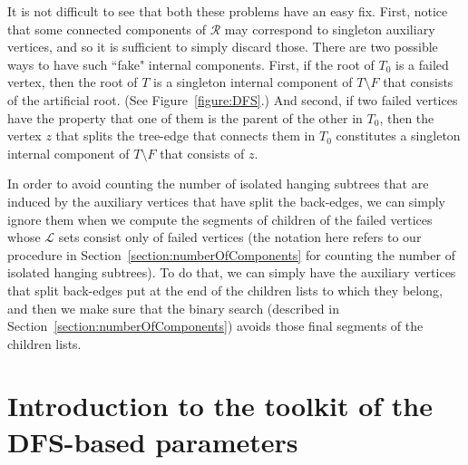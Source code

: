 \documentclass[11pt,a4paper]{article}
\begin{document}
It is not difficult to see that both these problems have an easy fix. First, notice that some connected components of $\mathcal{R}$ may correspond to singleton auxiliary vertices, and so it is sufficient to simply discard those. There are two possible ways to have such ``fake" internal components. First, if the root of $T_0$ is a failed vertex, then the root of $T$ is a singleton internal component of $T\setminus F$ that consists of the artificial root. (See Figure~\ref{figure:DFS}.) And second, if two failed vertices have the property that one of them is the parent of the other in $T_0$, then the vertex $z$ that splits the tree-edge that connects them in $T_0$ constitutes a singleton internal component of $T\setminus F$ that consists of $z$.

In order to avoid counting the number of isolated hanging subtrees that are induced by the auxiliary vertices that have split the back-edges, we can simply ignore them when we compute the segments of children of the failed vertices whose $\mathcal{L}$ sets consist only of failed vertices (the notation here refers to our procedure in Section~\ref{section:numberOfComponents} for counting the number of isolated hanging subtrees). To do that, we can simply have the auxiliary vertices that split back-edges put at the end of the children lists to which they belong, and then we make sure that the binary search (described in Section~\ref{section:numberOfComponents}) avoids those final segments of the children lists.


\section{Introduction to the toolkit of the DFS-based parameters}
\label{section:DFSConcepts}
\end{document}
